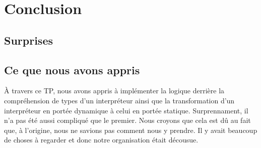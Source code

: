 \documentclass[a4paper,12pt]{article}
\begin{document}
\newpage
\section{Conclusion}
    \subsection{Surprises}
    \subsection{Ce que nous avons appris}
        À travers ce TP, nous avons appris à implémenter la logique derrière 
        la compréhension de types d'un interpréteur ainsi que la transformation
        d'un interpréteur en portée dynamique à celui en portée statique. 
        Surprennament, il n'a pas été aussi compliqué que le premier. Nous croyons
        que cela est dû au fait que, à l'origine, nous ne savions pas comment nous
        y prendre. Il y avait beaucoup de choses à regarder et donc notre 
        organisation était décousue.
\end{document}
